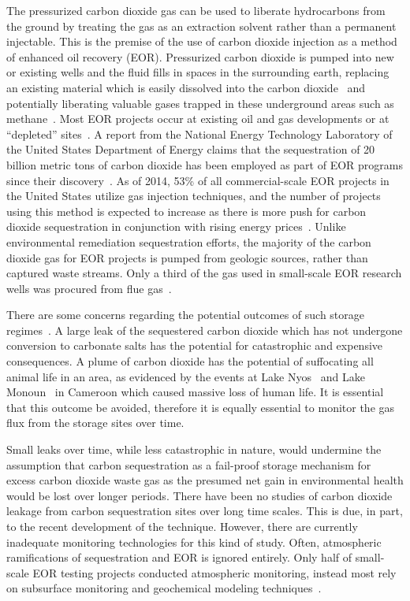 \documentclass[numbook, envcountsect, envcountsame, envcountreset, runningheads, twocolumn]{svjour3}
\begin{document}
		The pressurized carbon dioxide gas can be used to liberate hydrocarbons from the ground by treating the gas as an extraction solvent rather than a permanent injectable.  This is the premise of the use of carbon dioxide injection as a method of enhanced oil recovery (EOR).  Pressurized carbon dioxide is pumped into new or existing wells and the fluid fills in spaces in the surrounding earth, replacing an existing material which is easily dissolved into the carbon dioxide~\cite{chadwick_latest_2009} and potentially liberating valuable gases trapped in these underground areas such as methane~\cite{white_sequestration_2005}.  Most EOR projects occur at existing oil and gas developments or at ``depleted'' sites~\cite{cook_what_2014}.  A report from the National Energy Technology Laboratory of the United States Department of Energy claims that the sequestration of 20 billion metric tons of carbon dioxide has been employed as part of EOR programs since their discovery~\cite{kuuskraa_improving_2011, kuuskraa_co2_2013}.  As of 2014, 53\% of all commercial-scale EOR projects in the United States utilize gas injection techniques, and the number of projects using this method is expected to increase as there is more push for carbon dioxide sequestration in conjunction with rising energy prices~\cite{manrique_eor_2006}. Unlike environmental remediation sequestration efforts, the majority of the carbon dioxide gas for EOR projects is pumped from geologic sources, rather than captured waste streams.  Only a third of the gas used in small-scale EOR research wells was procured from flue gas~\cite{cook_what_2014}.
		
		There are some concerns regarding the potential outcomes of such storage regimes~\cite{kharaka_potential_2009}.  A large leak of the sequestered carbon dioxide which has not undergone conversion to carbonate salts has the potential for catastrophic and expensive consequences.  A plume of carbon dioxide has the potential of suffocating all animal life in an area, as evidenced by the events at Lake Nyos~\cite{kling_1986_1987} and Lake Monoun~\cite{sigurdsson_origin_1987} in Cameroon which caused massive loss of human life.  It is essential that this outcome be avoided, therefore it is equally essential to monitor the gas flux from the storage sites over time.  
		
		Small leaks over time, while less catastrophic in nature, would undermine the assumption that carbon sequestration as a fail-proof storage mechanism for excess carbon dioxide waste gas as the presumed net gain in environmental health would be lost over longer periods.  There have been no studies of carbon dioxide leakage from carbon sequestration sites over long time scales.  This is due, in part, to the recent development of the technique.  However, there are currently inadequate monitoring technologies for this kind of study.  Often, atmospheric ramifications of sequestration and EOR is ignored entirely.  Only half of small-scale EOR testing projects conducted atmospheric monitoring, instead most rely on subsurface monitoring and geochemical modeling techniques~\cite{cook_what_2014}.
		
\end{document}
